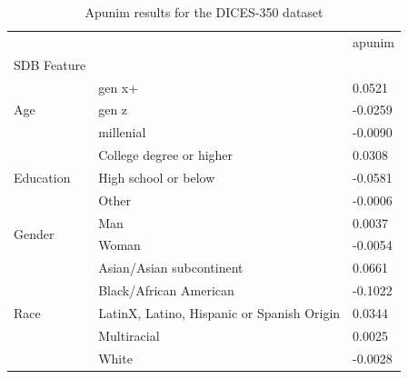 \begin{table}[t]
\caption{Apunim results for the DICES-350 dataset}
\label{tab:kumar_apunim_only}
\begin{tabular}{lll}
\toprule
 &  & apunim \\
SDB Feature &  &  \\
\midrule
\multirow[t]{3}{*}{Age} & gen x+ & 0.0521 \\
 & gen z & -0.0259 \\
 & millenial & -0.0090 \\
\cline{1-3}
\multirow[t]{3}{*}{Education} & College degree or higher & 0.0308 \\
 & High school or below & -0.0581 \\
 & Other & -0.0006 \\
\cline{1-3}
\multirow[t]{2}{*}{Gender} & Man & 0.0037 \\
 & Woman & -0.0054 \\
\cline{1-3}
\multirow[t]{5}{*}{Race} & Asian/Asian subcontinent & 0.0661 \\
 & Black/African American & -0.1022 \\
 & LatinX, Latino, Hispanic or Spanish Origin & 0.0344 \\
 & Multiracial & 0.0025 \\
 & White & -0.0028 \\
\cline{1-3}
\bottomrule
\end{tabular}
\end{table}
